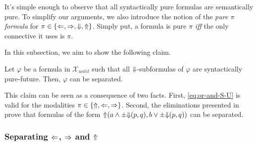 \documentclass[a4paper,UKenglish,cleveref, autoref, thm-restate, numberwithinsect]{lipics-v2021}
\def\Larrow{\ensuremath\mathord{\Leftarrow}}
\def\Rarrow{\ensuremath\mathord{\Rightarrow}}
\def\Uarrow{\ensuremath\mathord{\Uparrow}}
\def\Darrow{\ensuremath\mathord{\Downarrow}}
\begin{document}
It's simple enough to observe that all syntactically pure formulas are semantically pure. To simplify our arguments, we also introduce the notion of the \textit{pure $\pi$ formula} for $\pi \in \{ \Larrow, \Rarrow, \Darrow, \Uarrow \}$. Simply put, a formula is pure $\pi$ \textit{iff} the only connective it uses is $\pi$.

In this subsection, we aim to show the following claim.
\begin{claim*}
    \label{claim:partial-separation-trees}
    Let $\varphi$ be a formula in $\mathcal{X}_{until}$ such that all $\Darrow$-subformulas of $\varphi$ are syntactically pure-future. Then, $\varphi$ can be separated.
\end{claim*}
This claim can be seen as a consequence of two facts. First, \cref{eq:or-and-S-U} is valid for the modalities $\pi \in \{\Uarrow, \Larrow, \Rarrow\}$. Second, the eliminations presented in \cite{xpathComplete} prove that formulas of the form $\Uarrow(a \land \pm \Darrow(p, q), b \lor \pm \Darrow(p, q))$ can be separated.

\subsubsection{Separating $\Larrow$, $\Rarrow$ and $\Uarrow$}
\end{document}
